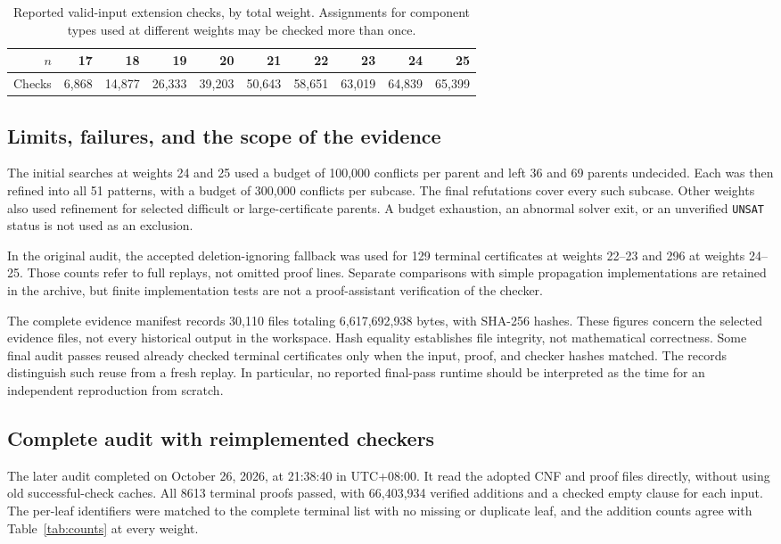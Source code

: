 \begin{table}[H]
\centering
\caption{Reported valid-input extension checks, by total weight.
Assignments for component types used at different weights may be checked
more than once.}\label{tab:extensions}
\begin{tabular}{@{}rrrrrrrrrr@{}}
\toprule
$n$&17&18&19&20&21&22&23&24&25\\
\midrule
Checks&6,868&14,877&26,333&39,203&50,643&58,651&63,019&64,839&65,399\\
\bottomrule
\end{tabular}
\end{table}

\subsection{Limits, failures, and the scope of the evidence}
The initial searches at weights 24 and 25 used a budget of 100,000
conflicts per parent and left 36 and 69 parents undecided. Each was then
refined into all 51 patterns, with a budget of 300,000 conflicts per
subcase. The final refutations cover every such subcase. Other weights
also used refinement for selected difficult or large-certificate parents.
A budget exhaustion, an abnormal solver exit, or an unverified
\texttt{UNSAT} status is not used as an exclusion.

In the original audit, the accepted deletion-ignoring fallback was used for 129 terminal
certificates at weights 22--23 and 296 at weights 24--25. Those counts
refer to full replays, not omitted proof lines. Separate comparisons with
simple propagation implementations are retained in the archive, but
finite implementation tests are not a proof-assistant verification of
the checker.

The complete evidence manifest records 30,110 files totaling
6,617,692,938 bytes, with SHA-256 hashes. These figures concern the
selected evidence files, not every historical output in the workspace.
Hash equality establishes file integrity, not mathematical correctness.
Some final audit passes reused already checked terminal certificates only
when the input, proof, and checker hashes matched. The records distinguish
such reuse from a fresh replay. In particular, no reported final-pass
runtime should be interpreted as the time for an independent reproduction
from scratch.


\subsection{Complete audit with reimplemented checkers}\label{sec:full-audit}
The later audit completed on October 26, 2026, at 21:38:40 in
UTC+08:00. It read the adopted CNF and proof files directly, without
using old successful-check caches. All 8613 terminal proofs passed,
with 66,403,934 verified additions and a checked empty clause for each
input. The per-leaf identifiers were matched to the complete terminal
list with no missing or duplicate leaf, and the addition counts agree
with Table~\ref{tab:counts} at every weight.

